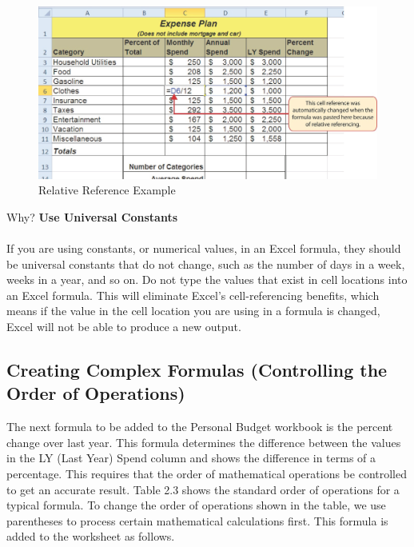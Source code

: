 \begin{figure}[H]
	\centering
	\includegraphics[width=\maxwidth{.95\linewidth}]{gfx/ch02_fig05}
	\caption{Relative Reference Example}
	\label{02:fig05}
\end{figure}

\begin{center}
	\begin{infobox}{Why?}
		\textbf{Use Universal Constants}
		\\
		\\
		If you are using constants, or numerical values, in an Excel formula, they should be universal constants that do not change, such as the number of days in a week, weeks in a year, and so on. Do not type the values that exist in cell locations into an Excel formula. This will eliminate Excel's cell-referencing benefits, which means if the value in the cell location you are using in a formula is changed, Excel will not be able to produce a new output.
	\end{infobox}
\end{center}

\subsection{Creating Complex Formulas (Controlling the Order of Operations)}

The next formula to be added to the Personal Budget workbook is the percent change over last year. This formula determines the difference between the values in the LY (Last Year) Spend column and shows the difference in terms of a percentage. This requires that the order of mathematical operations be controlled to get an accurate result. Table 2.3 shows the standard order of operations for a typical formula. To change the order of operations shown in the table, we use parentheses to process certain mathematical calculations first. This formula is added to the worksheet as follows.

